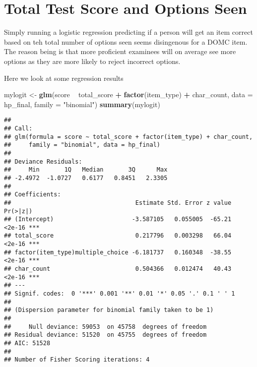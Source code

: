 \documentclass[]{book}
\newenvironment{Shaded}{\begin{snugshade}}{\end{snugshade}}
\newcommand{\KeywordTok}[1]{\textcolor[rgb]{0.13,0.29,0.53}{\textbf{#1}}}
\newcommand{\DataTypeTok}[1]{\textcolor[rgb]{0.13,0.29,0.53}{#1}}
\newcommand{\StringTok}[1]{\textcolor[rgb]{0.31,0.60,0.02}{#1}}
\newcommand{\OperatorTok}[1]{\textcolor[rgb]{0.81,0.36,0.00}{\textbf{#1}}}
\newcommand{\NormalTok}[1]{#1}
\theoremstyle{definition}
\theoremstyle{definition}
\theoremstyle{definition}
\theoremstyle{remark}
\begin{document}
\begin{Shaded}
\end{Shaded}

\chapter{Total Test Score and Options
Seen}\label{total-test-score-and-options-seen}

Simply running a logistic regression predicting if a person will get an
item correct based on teh total number of options seen seems disingenous
for a DOMC item. The reason being is that more proficient examinees will
on average see more options as they are more likely to reject incorrect
options.

Here we look at some regression results

\begin{Shaded}
\begin{Highlighting}[]
\NormalTok{mylogit <-}\StringTok{ }\KeywordTok{glm}\NormalTok{(score }\OperatorTok{~}\StringTok{ }\NormalTok{total_score }\OperatorTok{+}\StringTok{ }\KeywordTok{factor}\NormalTok{(item_type) }\OperatorTok{+}\StringTok{ }\NormalTok{char_count, }\DataTypeTok{data =}\NormalTok{ hp_final, }\DataTypeTok{family =} \StringTok{"binomial"}\NormalTok{)}
\KeywordTok{summary}\NormalTok{(mylogit) }
\end{Highlighting}
\end{Shaded}

\begin{verbatim}
## 
## Call:
## glm(formula = score ~ total_score + factor(item_type) + char_count, 
##     family = "binomial", data = hp_final)
## 
## Deviance Residuals: 
##     Min       1Q   Median       3Q      Max  
## -2.4972  -1.0727   0.6177   0.8451   2.3305  
## 
## Coefficients:
##                                   Estimate Std. Error z value Pr(>|z|)    
## (Intercept)                      -3.587105   0.055005  -65.21   <2e-16 ***
## total_score                       0.217796   0.003298   66.04   <2e-16 ***
## factor(item_type)multiple_choice -6.181737   0.160348  -38.55   <2e-16 ***
## char_count                        0.504366   0.012474   40.43   <2e-16 ***
## ---
## Signif. codes:  0 '***' 0.001 '**' 0.01 '*' 0.05 '.' 0.1 ' ' 1
## 
## (Dispersion parameter for binomial family taken to be 1)
## 
##     Null deviance: 59053  on 45758  degrees of freedom
## Residual deviance: 51520  on 45755  degrees of freedom
## AIC: 51528
## 
## Number of Fisher Scoring iterations: 4
\end{verbatim}
\end{document}
